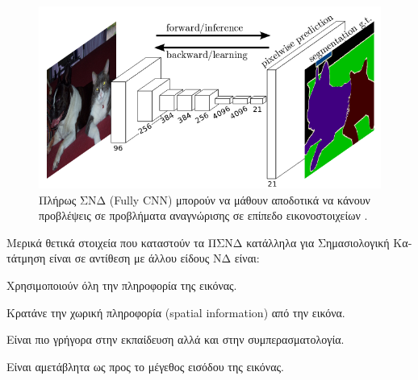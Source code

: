 \begin{figure}[H]
 \centering
 \includegraphics[width=\textwidth, scale=0.5]{Images/fcn_1}
\caption[Fully-CNN]{\textgreek{Πλήρως ΣΝΔ} (Fully CNN) \textgreek{μπορούν να μάθουν αποδοτικά να κάνουν προβλέψεις σε προβλήματα αναγνώρισης σε επίπεδο εικονοστοιχείων} \cite{fcnn_1}.}
 \label{fig:fcn_img}
\end{figure}



\textgreek{Μερικά θετικά στοιχεία που καταστούν τα ΠΣΝΔ κατάλληλα για Σημασιολογική Κατάτμηση είναι σε αντίθεση με άλλου είδους ΝΔ είναι}:

\begin{description}[labelindent=10pt, style=multiline, leftmargin=30pt]
 \item[1.] \textgreek{Χρησιμοποιούν όλη την πληροφορία της εικόνας.}
 \item[2.] \textgreek{Κρατάνε την χωρική πληροφορία} (spatial information) \textgreek{από την εικόνα.}
 \item[3.] \textgreek{Είναι πιο γρήγορα στην εκπαίδευση αλλά και στην συμπερασματολογία.}
 \item[4.] \textgreek{Είναι αμετάβλητα ως προς το μέγεθος εισόδου της εικόνας.}
\end{description}
\pagebreak
